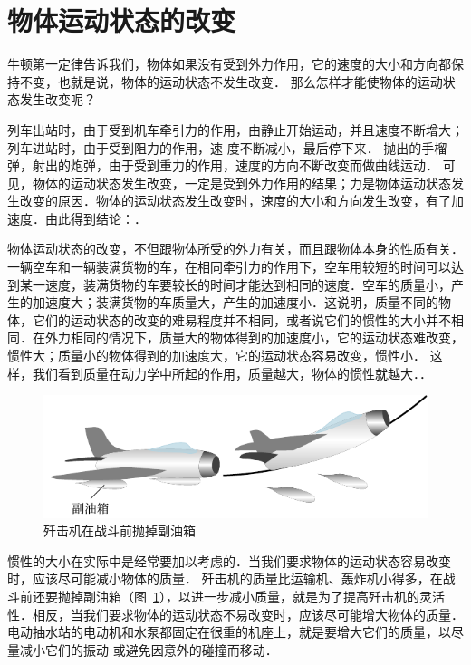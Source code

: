 \section{物体运动状态的改变}
牛顿第一定律告诉我们，物体如果没有受到外力作用，它的速度的大小和方向都保持不变，也就是说，物体的运动状态不发生改变．
那么怎样才能使物体的运动状态发生改变呢？

列车出站时，由于受到机车牵引力的作用，由静止开始运动，并且速度不断增大；列车进站时，由于受到阻力的作用，速
度不断减小，最后停下来．
抛出的手榴弹，射出的炮弹，由于受到重力的作用，速度的方向不断改变而做曲线运动．
可见，物体的运动状态发生改变，一定是受到外力作用的结果；力是物体运动状态发生改变的原因．物体的运动状态发生改变时，速度的大小和方向发生改变，有了加速度．由此得到结论：．

物体运动状态的改变，不但跟物体所受的外力有关，而且跟物体本身的性质有关．
一辆空车和一辆装满货物的车，在相同牵引力的作用下，空车用较短的时间可以达到某一速度，装满货物的车要较长的时间才能达到相同的速度．空车的质量小，产生的加速度大；装满货物的车质量大，产生的加速度小．这说明，质量不同的物体，它们的运动状态的改变的难易程度并不相同，或者说它们的惯性的大小并不相同．在外力相同的情况下，质量大的物体得到的加速度小，它的运动状态难改变，惯性大；质量小的物体得到的加速度大，它的运动状态容易改变，惯性小．
这样，我们看到质量在动力学中所起的作用，质量越大，物体的惯性就越大．．

\begin{figure}[htbp]
    \centering
    \includegraphics{fig/A/3-2.pdf}
    \caption{歼击机在战斗前抛掉副油箱}\label{fig_A_3-2}
\end{figure}

惯性的大小在实际中是经常要加以考虑的．当我们要求物体的运动状态容易改变时，应该尽可能减小物体的质量．
歼击机的质量比运输机、轰炸机小得多，在战斗前还要抛掉副油箱（图~\ref{fig_A_3-2}），以进一步减小质量，就是为了提高歼击机的灵活性．相反，当我们要求物体的运动状态不易改变时，应该尽可能增大物体的质量．
电动抽水站的电动机和水泵都固定在很重的机座上，就是要增大它们的质量，以尽量减小它们的振动
或避免因意外的碰撞而移动．

